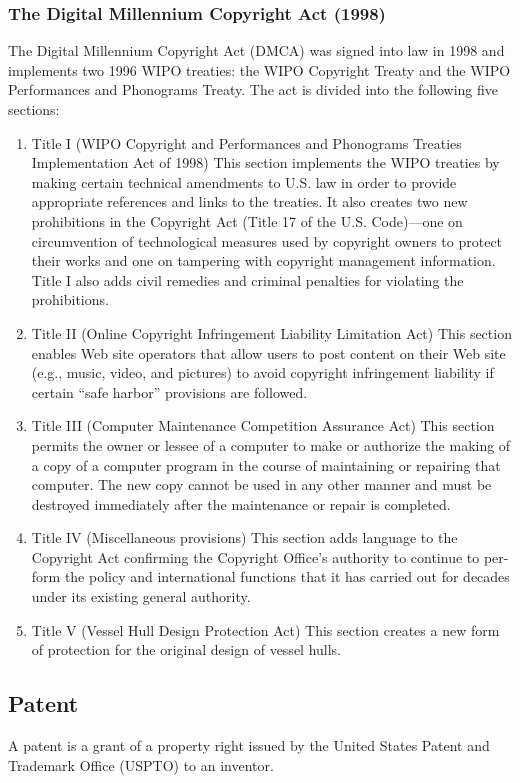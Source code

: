 \documentclass[11pt]{article}
\begin{document}
\subsubsection{The Digital Millennium Copyright Act (1998)}
\label{sec:org56c383e}
The Digital Millennium Copyright Act (DMCA) was signed into law in 1998 and implements two 1996 WIPO treaties: the WIPO Copyright Treaty and the WIPO Performances and Phonograms Treaty. The act is divided into the following five sections:
\begin{enumerate}
\item Title I (WIPO Copyright and Performances and Phonograms Treaties Implementation Act of 1998)
\label{sec:org9adb20c}
This section implements the WIPO treaties by making certain technical amendments to U.S. law in order to provide appropriate references and links to the treaties. It also creates two new prohibitions in the Copyright Act (Title 17 of the U.S. Code)—one on circumvention of technological measures used by copyright owners to protect their works and one on tampering with copyright management information. Title I also adds civil remedies and criminal penalties for violating the prohibitions.
\item Title II (Online Copyright Infringement Liability Limitation Act)
\label{sec:org9ea0198}
This section enables Web site operators that allow users to post content on their Web site (e.g., music, video, and pictures) to avoid copyright infringement liability if certain “safe harbor” provisions are followed.
\item Title III (Computer Maintenance Competition Assurance Act)
\label{sec:orgbd4d75e}
This section permits the owner or lessee of a computer to make or authorize the making of a copy of a computer program in the course of maintaining or repairing that computer. The new copy cannot be used in any other manner and must be destroyed immediately after the maintenance or repair is completed.
\item Title IV (Miscellaneous provisions)
\label{sec:org257305c}
This section adds language to the Copyright Act confirming the Copyright Office’s authority to continue to per- form the policy and international functions that it has carried out for decades
under its existing general authority.
\item Title V (Vessel Hull Design Protection Act)
\label{sec:org612fc93}
This section creates a new form of protection for the original design of vessel hulls.
\end{enumerate}
\subsection{Patent}
\label{sec:org9e0a427}
A patent is a grant of a property right issued by the United States Patent and Trademark Office (USPTO) to an inventor.
\end{document}
